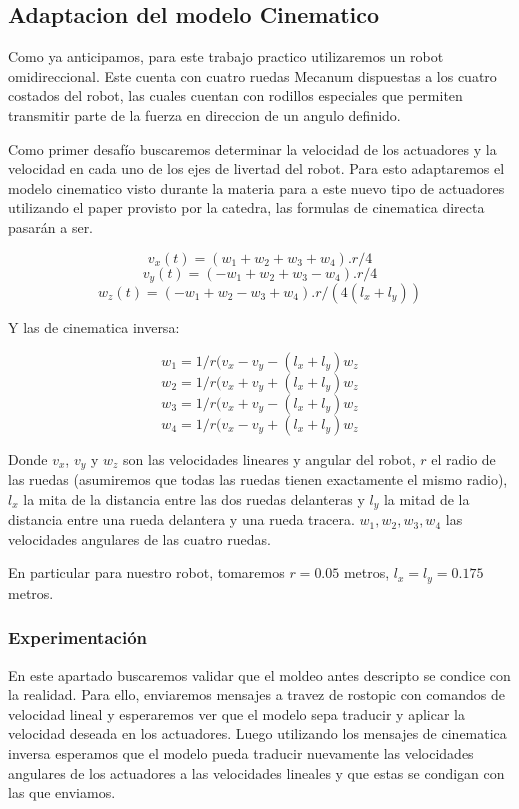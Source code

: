 \subsection{Adaptacion del modelo Cinematico}
Como ya anticipamos, para este trabajo practico utilizaremos un robot omidireccional. Este cuenta con cuatro ruedas Mecanum dispuestas a los cuatro costados del robot, las cuales cuentan con rodillos especiales que permiten transmitir parte de la fuerza en direccion de un angulo definido.

Como primer desafío buscaremos determinar la velocidad de los actuadores y la velocidad en cada uno de los ejes de livertad del robot. Para esto adaptaremos el modelo cinematico visto durante la materia para a este nuevo tipo de actuadores utilizando el paper provisto por la catedra, las formulas de cinematica directa pasarán a ser.


$$v_x(t)=(w_1+w_2+w_3+w_4).r/4$$
$$v_y(t)=(-w_1+w_2+w_3-w_4).r/4$$
$$w_z(t)=(-w_1+w_2-w_3+w_4).r/(4(l_x+l_y))$$


Y las de cinematica inversa:

$$ w_1 = 1/r (v_x - v_y - (l_x + l_y)w_z$$
$$ w_2 = 1/r (v_x + v_y + (l_x + l_y)w_z$$
$$ w_3 = 1/r (v_x + v_y - (l_x + l_y)w_z$$
$$ w_4 = 1/r (v_x - v_y + (l_x + l_y)w_z$$

Donde $v_x$, $v_y$ y $w_z$ son las velocidades lineares y angular del robot, $r$ el radio de las ruedas (asumiremos que todas las ruedas tienen exactamente el mismo radio), $l_x$ la mita de la distancia entre las dos ruedas delanteras y $l_y$ la mitad de la distancia entre una rueda delantera y una rueda tracera.
$w_1,w_2,w_3,w_4$ las velocidades angulares de las cuatro ruedas.



En particular para nuestro robot, tomaremos $r =0.05 $ metros, $l_x = l_y = 0.175 $ metros.

\subsubsection{Experimentación}

En este apartado buscaremos validar que el moldeo antes descripto se condice con la realidad. Para ello, enviaremos mensajes a travez de rostopic con comandos de velocidad lineal y esperaremos ver que el modelo sepa traducir y aplicar la velocidad deseada en los actuadores. Luego utilizando los mensajes de cinematica inversa esperamos que el modelo pueda traducir nuevamente las velocidades angulares de los actuadores a las velocidades lineales y que estas se condigan con las que enviamos.

